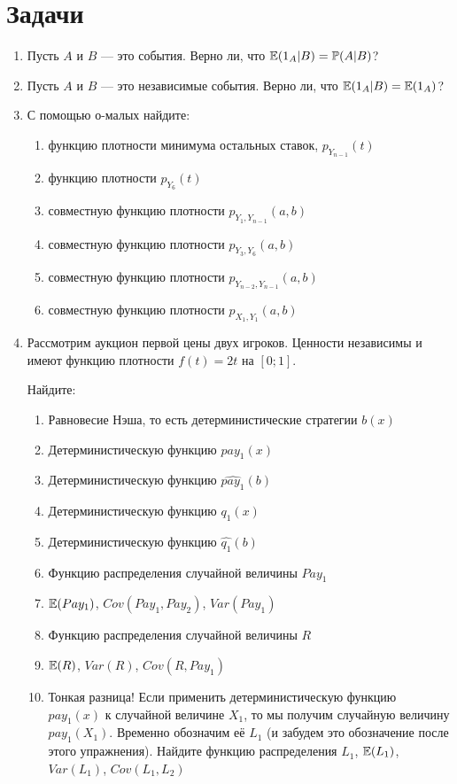 
\section{Задачи}
\begin{enumerate}

\item Пусть $ A $ и $ B $ — это события. Верно ли, что $ \mathbb{E}(1_{A}|B)=\mathbb{P}(A|B) $?

\item Пусть $ A $ и $ B $ — это независимые события. Верно ли, что $ \mathbb{E}(1_{A}|B)=\mathbb{E}(1_{A})  $?

\item С помощью о-малых найдите:

\begin{enumerate}
\item функцию плотности минимума остальных ставок, $ p_{Y_{n-1}}(t) $
\item функцию плотности $ p_{Y_{6}}(t) $
\item совместную функцию плотности $ p_{Y_{1},Y_{n-1}}(a,b) $
\item совместную функцию плотности $ p_{Y_{3},Y_{6}}(a,b) $
\item совместную функцию плотности $ p_{Y_{n-2},Y_{n-1}}(a,b) $
\item совместную функцию плотности $ p_{X_{1},Y_{1}}(a,b) $
\end{enumerate}

\item Рассмотрим аукцион первой цены двух игроков. Ценности независимы и имеют функцию плотности $f(t)=2t  $ на $ [0;1] $.

Найдите:
\begin{enumerate}
\item Равновесие Нэша, то есть детерминистические стратегии $ b(x) $
\item Детерминистическую функцию $ pay_{1}(x) $
\item Детерминистическую функцию $ \widehat{pay_{1}}(b) $
\item Детерминистическую функцию $ q_{1}(x) $
\item Детерминистическую функцию $ \widehat{q_{1}}(b) $
\item Функцию распределения случайной величины $ Pay_{1} $
\item $ \mathbb{E}(Pay_{1}) $, $ Cov(Pay_{1},Pay_{2}) $, $ Var(Pay_{1}) $
\item Функцию распределения случайной величины $ R $
\item $ \mathbb{E}(R) $, $ Var(R) $, $ Cov(R,Pay_{1}) $
\item Тонкая разница! Если применить детерминистическую функцию $ pay_{1}(x) $ к случайной величине $ X_{1} $, то мы получим случайную величину $ pay_{1}(X_{1}) $. Временно обозначим её $ L_{1} $ (и забудем это обозначение после этого упражнения). Найдите функцию распределения $ L_{1} $, $ \mathbb{E}(L_{1}) $, $ Var(L_{1}) $, $ Cov(L_{1},L_{2}) $


\end{enumerate}
\end{enumerate}
